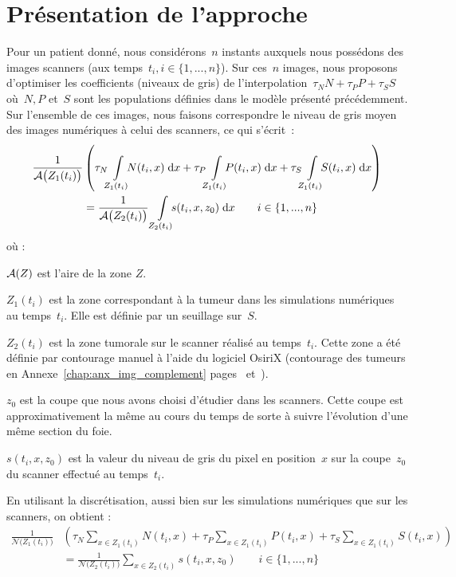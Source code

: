 \documentclass[main.tex]{subfiles}
\begin{document}
\section{Présentation de l'approche}
Pour un patient donné, nous considérons~$n$ instants auxquels nous possédons  des images scanners (aux temps~$t_i, i\in \{ 1,...,n \}$).%
Sur ces~$n$ images, nous proposons d'optimiser les coefficients (niveaux de gris) de l'interpolation~$\tau_N N + \tau_P P + \tau_S S$ où~$N, P$ et~$S$ sont les populations définies dans le modèle présenté précédemment. Sur l'ensemble de ces images, nous faisons correspondre le niveau de gris moyen des images numériques à celui des scanners, ce qui s'écrit~:
\begin{equation}
\label{eq:optim_grey_integ_aire}
\begin{aligned}
\frac{1}{\aire\big(Z_1(t_i)\big)}&\left( \tau_N\intperso{Z_1(t_i)}N(t_i,x) \dx + \tau_P\intperso{Z_1(t_i)}P(t_i,x) \dx + \tau_S\intperso{Z_1(t_i)} S(t_i,x) \dx \right) \\
&= \frac{1}{\aire\big(Z_2(t_i)\big)} \ \intperso{Z_2(t_i)} s(t_i,x,z_0) \dx \qquad i \in \{1,...,n\}
\end{aligned}
\end{equation}
où : \begin{myitemize}
\item $\mathcal{A}(Z)$ est l'aire de la zone $Z$.
\item $Z_1(t_i)$ est la zone correspondant à la tumeur dans les simulations numériques au temps~$t_i$. Elle est définie par un seuillage sur~$S$.
\item $Z_2(t_i)$ est la zone tumorale sur le scanner réalisé au temps~$t_i$. Cette zone a été définie par contourage manuel à l'aide du logiciel OsiriX (\cf contourage des tumeurs en Annexe~\ref{chap:anx_img_complement} pages~\pageref{fig:contourageNber} et~\pageref{fig:contourageChen}).
\item $z_0$ est la coupe que nous avons choisi d'étudier dans les scanners. Cette coupe est approximativement la même au cours du temps de sorte à suivre l'évolution d'une même section du foie. 
\item $s(t_i,x,z_0)$ est la valeur du niveau de gris du pixel en position~$x$ sur la coupe~$z_0$ du scanner effectué au temps~$t_i$.
\end{myitemize}
En utilisant la discrétisation, aussi bien sur les simulations numériques que sur les scanners, on obtient :
\begin{equation}
\label{eq:optim_grey_eq_discr}
\begin{aligned}
\frac{1}{\mathcal{N}\big(Z_1(t_i)\big)}&\left( \tau_N\!\!\sum_{x\in Z_1(t_i)}\!\!N(t_i,x) + \tau_P\!\!\sum_{x\in Z_1(t_i)}\!\!P(t_i,x) + \tau_S\!\!\sum_{x\in Z_1(t_i)}\!\!S(t_i,x) \right) \\
&= \frac{1}{\mathcal{N}\big(Z_2(t_i)\big)} \sum_{x\in Z_2(t_i)}\!\! s(t_i,x,z_0) \qquad i \in \{1,...,n\}
\end{aligned}
\end{equation}
\end{document}
